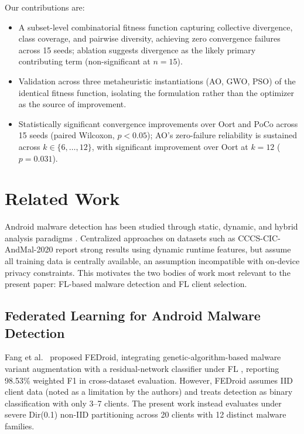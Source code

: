 \documentclass[conference]{IEEEtran}
\begin{document}
Our contributions are:
\vspace{-4pt}
\begin{itemize}
\setlength{\itemsep}{0pt}\setlength{\parskip}{0pt}
\item A subset-level combinatorial fitness function capturing collective divergence, class coverage, and pairwise diversity, achieving zero convergence failures across 15 seeds; ablation suggests divergence as the likely primary contributing term (non-significant at $n=15$).
\item Validation across three metaheuristic instantiations (AO, GWO, PSO) of the identical fitness function, isolating the formulation rather than the optimizer as the source of improvement.
\item Statistically significant convergence improvements over Oort and PoCo across 15 seeds (paired Wilcoxon, $p<0.05$); AO's zero-failure reliability is sustained across $k\in\{6,\dots,12\}$, with significant improvement over Oort at $k=12$ ($p=0.031$).
\end{itemize}
\vspace{-4pt}

\section{Related Work}

Android malware detection has been studied through static, dynamic, and hybrid analysis paradigms \cite{smmarwar2024review}. Centralized approaches on datasets such as CCCS-CIC-AndMal-2020 report strong results using dynamic runtime features, but assume all training data is centrally available, an assumption incompatible with on-device privacy constraints. This motivates the two bodies of work most relevant to the present paper: FL-based malware detection and FL client selection.

\subsection{Federated Learning for Android Malware Detection}
Fang et al.\ \cite{fang2023fedriod} proposed FEDroid, integrating genetic-algorithm-based malware variant augmentation with a residual-network classifier under FL \cite{mcmahan2017}, reporting 98.53\% weighted F1 in cross-dataset evaluation. However, FEDroid assumes IID client data (noted as a limitation by the authors) and treats detection as binary classification with only 3--7 clients. The present work instead evaluates under severe Dir(0.1) non-IID partitioning across 20 clients with 12 distinct malware families.
\end{document}
